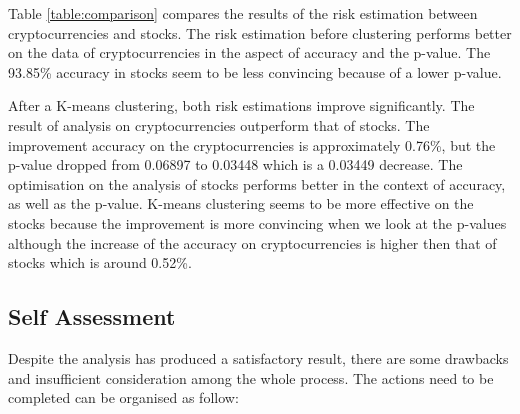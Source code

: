 \documentclass[11pt]{article} %
\theoremstyle{plain}
\theoremstyle{definition}
\begin{document}
Table \ref{table:comparison} compares the results of the risk estimation between cryptocurrencies and stocks. The risk estimation before clustering performs better on the data of cryptocurrencies in the aspect of accuracy and the p-value. The 93.85\% accuracy in stocks seem to be less convincing because of a lower p-value.

After a K-means clustering, both risk estimations improve significantly. The result of analysis on cryptocurrencies outperform that of stocks. The improvement accuracy on the cryptocurrencies is approximately 0.76\%, but the p-value dropped from 0.06897 to 0.03448 which is a 0.03449 decrease. The optimisation on the analysis of stocks performs better in the context of accuracy, as well as the p-value. K-means clustering seems to be more effective on the stocks because the improvement is more convincing when we look at the p-values although the increase of the accuracy on cryptocurrencies is higher then that of stocks which is around 0.52\%.

\subsection{Self Assessment}

Despite the analysis has produced a satisfactory result, there are some drawbacks and insufficient consideration among the whole process. The actions need to be completed can be organised as follow:
\end{document}
